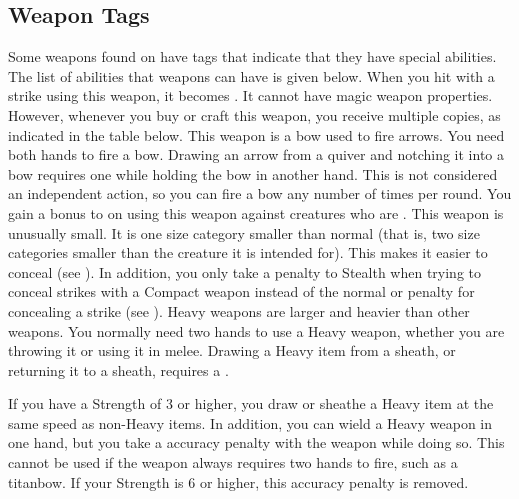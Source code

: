   \subsection{Weapon Tags}\label{Weapon Tags}
    Some weapons found on  have tags that indicate that they have special abilities. The list of abilities that weapons can have is given below.
     When you hit with a strike using this weapon, it becomes .
    It cannot have magic weapon properties.
    However, whenever you buy or craft this weapon, you receive multiple copies, as indicated in the table below.
     This weapon is a bow used to fire arrows.
    You need both hands to fire a bow.
    Drawing an arrow from a quiver and notching it into a bow requires one  while holding the bow in another hand.
    This is not considered an independent action, so you can fire a bow any number of times per round.
     You gain a  bonus to  on   using this weapon against creatures who are \grappled.
     This weapon is unusually small.
    It is one size category smaller than normal (that is, two size categories smaller than the creature it is intended for).
    This makes it easier to conceal (see ).
    In addition, you only take a  penalty to Stealth when trying to conceal strikes with a Compact weapon instead of the normal  or  penalty for concealing a strike (see ).
     Heavy weapons are larger and heavier than other weapons.
    You normally need two hands to use a Heavy weapon, whether you are throwing it or using it in melee.
    Drawing a Heavy item from a sheath, or returning it to a sheath, requires a .

    If you have a Strength of 3 or higher, you draw or sheathe a Heavy item at the same speed as non-Heavy items.
    In addition, you can wield a Heavy weapon in one hand, but you take a  accuracy penalty with the weapon while doing so.
    This cannot be used if the weapon always requires two hands to fire, such as a titanbow.
    If your Strength is 6 or higher, this accuracy penalty is removed.

